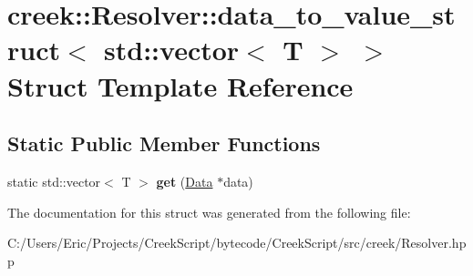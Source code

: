 \hypertarget{structcreek_1_1_resolver_1_1data__to__value__struct_3_01std_1_1vector_3_01_t_01_4_01_4}{}\section{creek\+:\+:Resolver\+:\+:data\+\_\+to\+\_\+value\+\_\+struct$<$ std\+:\+:vector$<$ T $>$ $>$ Struct Template Reference}
\label{structcreek_1_1_resolver_1_1data__to__value__struct_3_01std_1_1vector_3_01_t_01_4_01_4}
\subsection*{Static Public Member Functions}
\begin{DoxyCompactItemize}
\item 
static std\+::vector$<$ T $>$ {\bfseries get} (\hyperlink{classcreek_1_1_data}{Data} $\ast$data)\hypertarget{structcreek_1_1_resolver_1_1data__to__value__struct_3_01std_1_1vector_3_01_t_01_4_01_4_a3e99e6e87518ff0008ed1cb48ff029e5}{}\label{structcreek_1_1_resolver_1_1data__to__value__struct_3_01std_1_1vector_3_01_t_01_4_01_4_a3e99e6e87518ff0008ed1cb48ff029e5}

\end{DoxyCompactItemize}


The documentation for this struct was generated from the following file\+:\begin{DoxyCompactItemize}
\item 
C\+:/\+Users/\+Eric/\+Projects/\+Creek\+Script/bytecode/\+Creek\+Script/src/creek/Resolver.\+hpp\end{DoxyCompactItemize}
